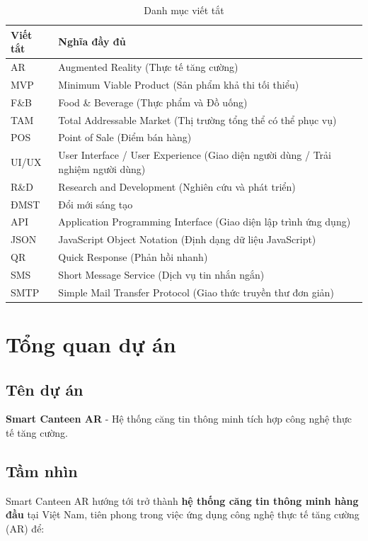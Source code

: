 \documentclass[12pt,a4paper]{article}
\begin{document}
\begin{table}[H]
\centering
\caption{Danh mục viết tắt}
\label{tab:abbreviations}
\begin{tabular}{@{}p{3cm}@{\hspace{1cm}}p{10cm}@{}} %
    \toprule %
    \textbf{Viết tắt} & \textbf{Nghĩa đầy đủ} \\
    \midrule %
    AR & Augmented Reality (Thực tế tăng cường) \\
    MVP & Minimum Viable Product (Sản phẩm khả thi tối thiểu) \\
    F\&B & Food \& Beverage (Thực phẩm và Đồ uống) \\
    TAM & Total Addressable Market (Thị trường tổng thể có thể phục vụ) \\
    POS & Point of Sale (Điểm bán hàng) \\
    UI/UX & User Interface / User Experience (Giao diện người dùng / Trải nghiệm người dùng) \\
    R\&D & Research and Development (Nghiên cứu và phát triển) \\
    ĐMST & Đổi mới sáng tạo \\
    API & Application Programming Interface (Giao diện lập trình ứng dụng) \\
    JSON & JavaScript Object Notation (Định dạng dữ liệu JavaScript) \\
    QR & Quick Response (Phản hồi nhanh) \\
    SMS & Short Message Service (Dịch vụ tin nhắn ngắn) \\
    SMTP & Simple Mail Transfer Protocol (Giao thức truyền thư đơn giản) \\
    \bottomrule %
\end{tabular}
\end{table}

\newpage

\section{Tổng quan dự án}

\subsection{Tên dự án}
\textbf{Smart Canteen AR} - Hệ thống căng tin thông minh tích hợp công nghệ thực tế tăng cường.
\subsection{Tầm nhìn}
Smart Canteen AR hướng tới trở thành \textbf{hệ thống căng tin thông minh hàng đầu} tại Việt Nam, tiên phong trong việc ứng dụng công nghệ thực tế tăng cường (AR) để:
\end{document}

